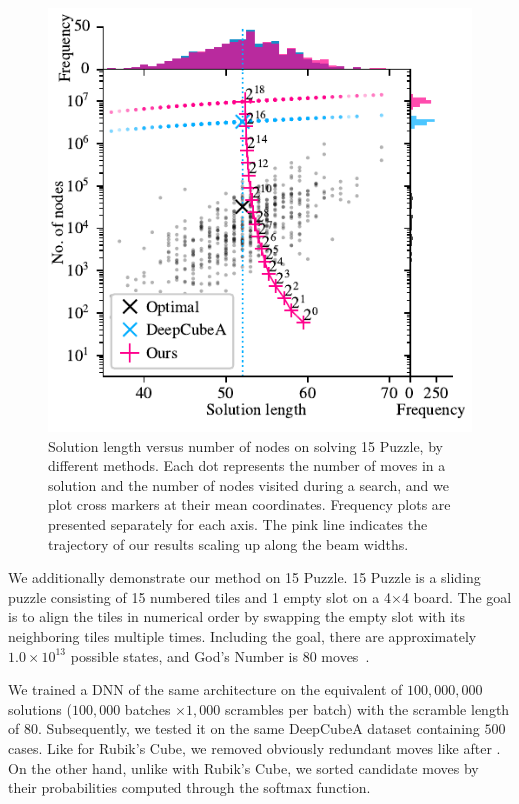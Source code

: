 \documentclass[nohyperref]{article}
\theoremstyle{plain}
\theoremstyle{definition}
\theoremstyle{remark}
\begin{document}
\begin{figure}[!t]
    \centering
    \includegraphics[width=1.0\columnwidth]{figures/appendix.15.pdf}
    \vspace{-1em}
    \caption{
        Solution length versus number of nodes on solving 15 Puzzle, by different methods.
        Each dot represents the number of moves in a solution and the number of nodes visited during a search, and we plot cross markers at their mean coordinates.
        Frequency plots are presented separately for each axis.
        The pink line indicates the trajectory of our results scaling up along the beam widths.
    }
    \label{fig:s2n15}
\end{figure}

We additionally demonstrate our method on 15 Puzzle.
15 Puzzle is a sliding puzzle consisting of 15 numbered tiles and 1 empty slot on a 4$\times$4 board.
The goal is to align the tiles in numerical order by swapping the empty slot with its neighboring tiles multiple times.
Including the goal, there are approximately $1.0\times10^{13}$ possible states, and God's Number is $80$ moves~\citep{brungger1999parallel,korf2008linear}.

We trained a DNN of the same architecture on the equivalent of $100,000,000$ solutions ($100,000$ batches $\times 1,000$ scrambles per batch) with the scramble length of $80$. Subsequently, we tested it on the same DeepCubeA dataset containing $500$ cases.
Like for Rubik's Cube, we removed obviously redundant moves like \textrightarrow{} after \textleftarrow.
On the other hand, unlike with Rubik's Cube, we sorted candidate moves by their probabilities computed through the softmax function.
\end{document}
